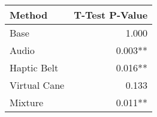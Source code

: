 
\centering
\begin{tabular}{lr}
\toprule
      Method & T-Test P-Value \\
\midrule
        Base &          1.000 \\
       Audio &        0.003** \\
 Haptic Belt &        0.016** \\
Virtual Cane &          0.133 \\
     Mixture &        0.011** \\
\bottomrule
\end{tabular}
